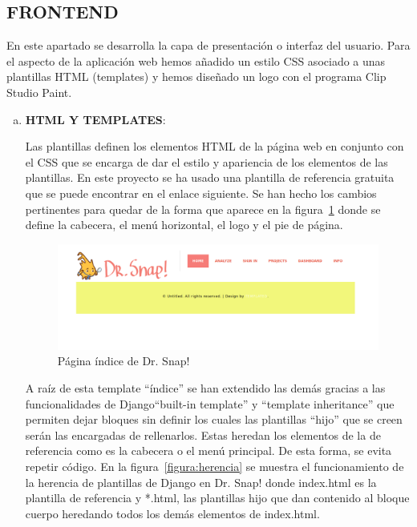 \documentclass[a4paper, 12pt]{book}
\begin{document}
\subsection{FRONTEND}
En este apartado se desarrolla la capa de presentación o interfaz del usuario. Para el aspecto de la aplicación web hemos añadido un estilo CSS asociado a unas plantillas HTML (templates) y hemos diseñado un logo con el programa Clip Studio Paint.
\begin{enumerate}[a)]
    \item \textbf{HTML Y TEMPLATES}:
    
    Las plantillas definen los elementos HTML de la página web en conjunto con el CSS que se encarga de dar el estilo y apariencia de los elementos de las plantillas. En este proyecto se ha usado una plantilla de referencia gratuita que se puede encontrar en el enlace siguiente. Se han hecho los cambios pertinentes para quedar de la forma que aparece en la figura~\ref{figura:index} donde se define la cabecera, el menú horizontal, el logo y el pie de página.\\
    
     \begin{figure}[h]
            \centering
            \includegraphics[scale=0.32]{img/index.png}
            \caption{Página índice de Dr. Snap!}
            \label{figura:index}
        \end{figure}
    
    A raíz de esta template ``índice'' se han extendido las demás gracias a las funcionalidades de Django``built-in template'' y ``template inheritance'' que permiten dejar bloques sin definir los cuales las plantillas ``hijo''  que se creen serán las encargadas de rellenarlos. Estas heredan los elementos de la de referencia como es la cabecera o el menú principal. De esta forma, se evita repetir código. En la figura~\ref{figura:herencia} se muestra el funcionamiento de la herencia de plantillas de Django en Dr. Snap! donde index.html es la plantilla de referencia y *.html, las plantillas hijo que dan contenido al bloque cuerpo heredando todos los demás elementos de index.html.
    

\end{enumerate}
\end{document}
